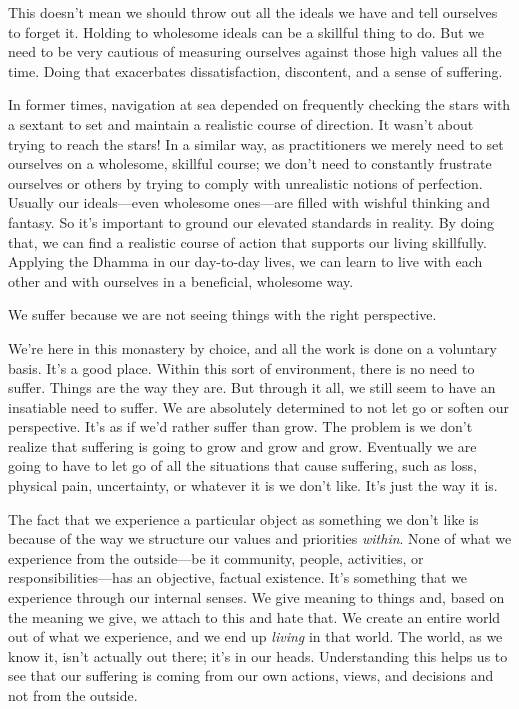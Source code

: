 This doesn't mean we should throw out all the ideals we have and tell 
ourselves to forget it. Holding to wholesome ideals can be a skillful 
thing to do. But we need to be very cautious of measuring ourselves 
against those high values all the time. Doing that exacerbates 
dissatisfaction, discontent, and a sense of suffering.

In former times, navigation at sea depended on frequently checking the 
stars with a sextant to set and maintain a realistic course of 
direction. It wasn't about trying to reach the stars! In a similar way, 
as practitioners we merely need to set ourselves on a wholesome, 
skillful course; we don't need to constantly frustrate ourselves or 
others by trying to comply with unrealistic notions of perfection. 
Usually our ideals---even wholesome ones---are filled with wishful 
thinking and fantasy. So it's important to ground our elevated 
standards in reality. By doing that, we can find a realistic course of 
action that supports our living skillfully. Applying the Dhamma in our 
day-to-day lives, we can learn to live with each other and with 
ourselves in a beneficial, wholesome way.


We suffer because we are not seeing things with the right perspective.

We're here in this monastery by choice, and all the work is done on a 
voluntary basis. It's a good place. Within this sort of environment, 
there is no need to suffer. Things are the way they are. But through it 
all, we still seem to have an insatiable need to suffer. We are 
absolutely determined to not let go or soften our perspective. It's as 
if we'd rather suffer than grow. The problem is we don't realize that 
suffering is going to grow and grow and grow. Eventually we are going 
to have to let go of all the situations that cause suffering, such as 
loss, physical pain, uncertainty, or whatever it is we don't like. It's 
just the way it is.

The fact that we experience a particular object as something we don't 
like is because of the way we structure our values and priorities 
\emph{within}. None of what we experience from the outside---be it 
community, people, activities, or responsibilities---has an objective, 
factual existence. It's something that we experience through our 
internal senses. We give meaning to things and, based on the meaning we 
give, we attach to this and hate that. We create an entire world out of 
what we experience, and we end up \emph{living} in that world. The 
world, as we know it, isn't actually out there; it's in our heads. 
Understanding this helps us to see that our suffering is coming from 
our own actions, views, and decisions and not from the outside.

